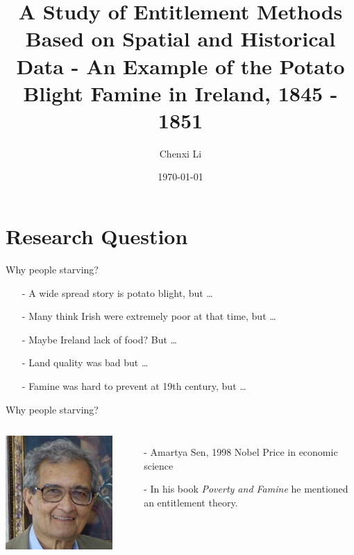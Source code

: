 \documentclass{beamer}[12pt]
\title{A Study of Entitlement Methods Based on Spatial and Historical Data - An Example of the Potato Blight Famine in Ireland, 1845 - 1851}
\date{\today}
\author{Chenxi Li}
\institute{Trinity College Dublin\\College Green, Dublin 2}
\begin{document}
\maketitle

\section{Research Question}
\begin{frame}{Why people starving?}
\begin{itemize}
	\item[-] A wide spread story is potato blight, but \citep{bourke1964emergence} \ldots
	\item[-] Many think Irish were extremely poor at that time, but \citep{wegge2017immigrants} \ldots
	\item[-] Maybe Ireland lack of food? But \citep{donnelly2002great} \ldots 
	\item[-] Land quality was bad but \citep{kelly2015ireland} \ldots
	\item[-] Famine was hard to prevent at 19th century, but \ldots
\end{itemize}
\end{frame}

\begin{frame}{Why people starving?}
	\begin{columns}
		\centering
		\includegraphics[width=0.5\linewidth]{sen.jpg}
		
			\begin{itemize}
				\item[-] Amartya Sen, 1998 Nobel Price in economic science
				\item[-] In his book \textit{Poverty and Famine} he mentioned an entitlement theory. \citep{sen1982poverty}
			\end{itemize}
	  \end{columns}
\end{frame}
\end{document}

